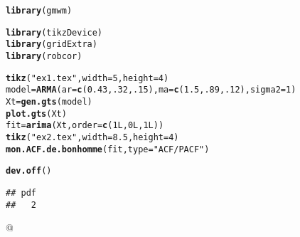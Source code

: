 \documentclass{article}\usepackage[]{graphicx}\usepackage[]{color}
\makeatletter
\newcommand{\hlnum}[1]{\textcolor[rgb]{0.686,0.059,0.569}{#1}}%
\newcommand{\hlstr}[1]{\textcolor[rgb]{0.192,0.494,0.8}{#1}}%
\newcommand{\hlstd}[1]{\textcolor[rgb]{0.345,0.345,0.345}{#1}}%
\newcommand{\hlkwb}[1]{\textcolor[rgb]{0.69,0.353,0.396}{#1}}%
\newcommand{\hlkwc}[1]{\textcolor[rgb]{0.333,0.667,0.333}{#1}}%
\newcommand{\hlkwd}[1]{\textcolor[rgb]{0.737,0.353,0.396}{\textbf{#1}}}%
\newenvironment{kframe}{%
 \def\at@end@of@kframe{}%
 \ifinner\ifhmode%
  \def\at@end@of@kframe{\end{minipage}}%
  \begin{minipage}{\columnwidth}%
 \fi\fi%
 \def\FrameCommand##1{\hskip\@totalleftmargin \hskip-\fboxsep
 \colorbox{shadecolor}{##1}\hskip-\fboxsep
     \hskip-\linewidth \hskip-\@totalleftmargin \hskip\columnwidth}%
 \MakeFramed {\advance\hsize-\width
   \@totalleftmargin\z@ \linewidth\hsize
   \@setminipage}}%
 {\par\unskip\endMakeFramed%
 \at@end@of@kframe}
\newenvironment{knitrout}{}{} %
\makeatother
\begin{document}
\begin{knitrout}
\color{fgcolor}\begin{kframe}
\begin{alltt}
\hlkwd{library}\hlstd{(gmwm)}
\end{alltt}


{\ttfamily\noindent\itshape\color{messagecolor}{\#\# Loading required package: ggplot2}}\begin{alltt}
\hlkwd{library}\hlstd{(tikzDevice)}
\hlkwd{library}\hlstd{(gridExtra)}
\hlkwd{library}\hlstd{(robcor)}

\hlkwd{tikz}\hlstd{(}\hlstr{"ex1.tex"}\hlstd{,} \hlkwc{width} \hlstd{=} \hlnum{5}\hlstd{,} \hlkwc{height} \hlstd{=} \hlnum{4}\hlstd{)}
\hlstd{model} \hlkwb{=} \hlkwd{ARMA}\hlstd{(}\hlkwc{ar} \hlstd{=} \hlkwd{c}\hlstd{(}\hlnum{0.43}\hlstd{,}\hlnum{.32}\hlstd{,} \hlnum{.15}\hlstd{),} \hlkwc{ma} \hlstd{=} \hlkwd{c}\hlstd{(}\hlnum{1.5}\hlstd{,} \hlnum{.89}\hlstd{,} \hlnum{.12}\hlstd{),} \hlkwc{sigma2} \hlstd{=} \hlnum{1}\hlstd{)}
\hlstd{Xt} \hlkwb{=} \hlkwd{gen.gts}\hlstd{(model)}
\hlkwd{plot.gts}\hlstd{(Xt)}
\hlstd{fit} \hlkwb{=} \hlkwd{arima}\hlstd{(Xt,}\hlkwc{order} \hlstd{=} \hlkwd{c}\hlstd{(}\hlnum{1L}\hlstd{,}\hlnum{0L}\hlstd{,}\hlnum{1L}\hlstd{))}
\hlkwd{tikz}\hlstd{(}\hlstr{"ex2.tex"}\hlstd{,} \hlkwc{width} \hlstd{=} \hlnum{8.5}\hlstd{,} \hlkwc{height} \hlstd{=} \hlnum{4}\hlstd{)}
\hlkwd{mon.ACF.de.bonhomme}\hlstd{(fit,} \hlkwc{type} \hlstd{=} \hlstr{"ACF/PACF"}\hlstd{)}
\end{alltt}


{\ttfamily\noindent\bfseries\color{errorcolor}{\#\# Error in .acf(x2, lagmax, cor, demean): object 'x2' not found}}\begin{alltt}
\hlkwd{dev.off}\hlstd{()}
\end{alltt}
\begin{verbatim}
## pdf 
##   2
\end{verbatim}
\end{kframe}
\end{knitrout}





@





\begin{figure}

\end{figure}

\begin{figure}

\end{figure}
\end{document}
